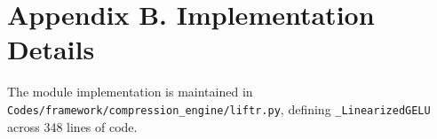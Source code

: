 \section*{Appendix B. Implementation Details}
The module implementation is maintained in \texttt{Codes/framework/compression\_engine/liftr.py}, defining \texttt{_LinearizedGELU} across 348 lines of code.

